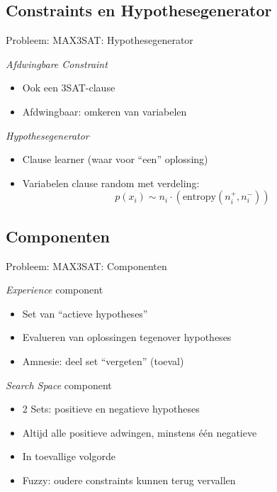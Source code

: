 \documentclass[handout]{beamer}
\begin{document}
\subsection{Constraints en Hypothesegenerator}
\begin{frame}{Probleem: MAX3SAT: Hypothesegenerator}
\begin{block}{\emph{Afdwingbare Constraint}}
\begin{itemize}[<+->]
 \item Ook een 3SAT-clause
 \item Afdwingbaar: omkeren van variabelen
\end{itemize}
\end{block}
\begin{block}{\emph{Hypothesegenerator}}
\begin{itemize}[<+->]
 \item Clause learner (waar voor ``een'' oplossing)
 \item Variabelen clause random met verdeling:
 \begin{equation}{}
  p(x_i)\sim n_i\cdot\left(\mbox{entropy}\left(n_i^+,n_i^-\right)\right)
 \end{equation}
\end{itemize}
\end{block}
\end{frame}
\subsection{Componenten}
\begin{frame}{Probleem: MAX3SAT: Componenten}
\begin{block}{\emph{Experience} component}
\begin{itemize}[<+->]
 \item Set van ``actieve hypotheses''
 \item Evalueren van oplossingen tegenover hypotheses
 \item Amnesie: deel set ``vergeten'' (toeval)
\end{itemize}
\end{block}
\begin{block}{\emph{Search Space} component}
\begin{itemize}[<+->]
 \item 2 Sets: positieve en negatieve hypotheses
 \item Altijd alle positieve adwingen, minstens \'e\'en negatieve
 \item In toevallige volgorde
 \item Fuzzy: oudere constraints kunnen terug vervallen
\end{itemize}
\end{block}
\end{frame}
\end{document}
